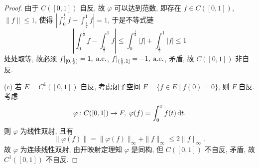 \begin{proof}
    由于 $C([0,1])$ 自反, 故 $\varphi$ 可以达到范数, 即存在 $f\in C([0,1])$, $\|f\|\leq 1$, 使得
    $|\int_0^{\frac{1}{2}}f-\int_{\frac{1}{2}}^1 f|=1$, 于是不等式链
    \[\left|\int_0^{\frac{1}{2}}f-\int_{\frac{1}{2}}^1f\right|\leq\int_0^{\frac{1}{2}}|f|+\int_{\frac{1}{2}}^1 |f|\leq 1\]
    处处取等, 故必须 $f|_{[0,\frac{1}{2})}=1,\;\mathrm{a.e.}$, $f|_{(\frac{1}{2},1]}=-1,\;\mathrm{a.e.}$,
    矛盾, 故 $C([0,1])$ 非自反.

    (c) 若 $E=C^1([0,1])$ 自反, 考虑闭子空间 $F=\{f\in E\mid f(0)=0\}$, 则 $F$ 自反.
    考虑
    \[\varphi: C([0,1])\to F,\;\varphi(f)=\int_0^x f(t)\mathop{}\!\mathrm{d} t.\]
    则 $\varphi$ 为线性双射, 且有
    \[\|\varphi(f)\|=\|\varphi(f)\|_{\infty}+\|f\|_{\infty}\leq 2\|f\|_{\infty}.\]
    故 $\varphi$ 为连续线性双射, 由开映射定理知 $\varphi$ 是同构, 但 $C([0,1])$ 不自反,
    矛盾, 故 $C^1([0,1])$ 不自反.
\end{proof}